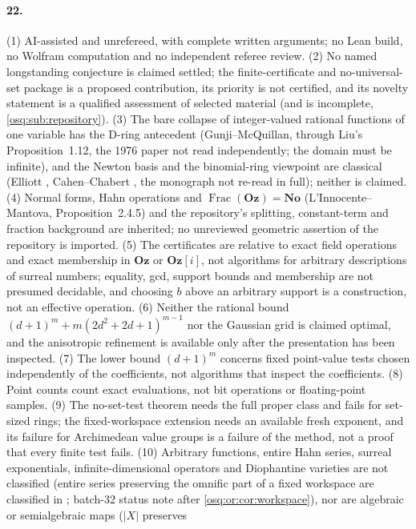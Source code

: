 \documentclass[11pt,letterpaper]{article}
\numberwithin{equation}{section}
\theoremstyle{definition}
\theoremstyle{remark}
\theoremstyle{plain}
\newcommand{\No}{\mathbf{No}}
\newcommand{\Oz}{\mathbf{Oz}}
\newcommand{\GOz}{\Oz[i]}
\newcommand{\Frac}{\operatorname{Frac}}
\begin{document}
\paragraph{22.} (1) AI-assisted and unrefereed, with complete written arguments; no Lean build, no Wolfram computation and no independent referee
review. (2) No named longstanding conjecture is claimed settled; the finite-certificate and no-universal-set package is a proposed contribution, its
priority is not certified, and its novelty statement is a qualified assessment of selected material (and is incomplete, \cref{osq:sub:repository}).
(3) The bare collapse of integer-valued rational functions of one variable has the D-ring antecedent (Gunji--McQuillan, through Liu's
Proposition~1.12, the 1976 paper not read independently; the domain must be infinite), and the Newton basis and the binomial-ring viewpoint are
classical (Elliott \cite{ElliottBirings}, Cahen--Chabert \cite{CC}, the monograph not re-read in full); neither is claimed. (4) Normal forms, Hahn operations and $\Frac(\Oz)=\No$
(L'Innocente--Mantova, Proposition~2.4.5) and the repository's splitting, constant-term and fraction background are inherited; no unreviewed
geometric assertion of the repository is imported. (5) The certificates are relative to exact field operations and exact membership in $\Oz$ or
$\GOz$, not algorithms for arbitrary descriptions of surreal numbers; equality, gcd, support bounds and membership are not presumed decidable, and
choosing $b$ above an arbitrary support is a construction, not an effective operation. (6) Neither the rational bound
$(d+1)^m+m(2d^2+2d+1)^{m-1}$ nor the Gaussian grid is claimed optimal, and the anisotropic refinement is available only after the presentation has
been inspected. (7) The lower bound $(d+1)^m$ concerns fixed point-value tests chosen independently of the coefficients, not algorithms that inspect
the coefficients. (8) Point counts count exact evaluations, not bit operations or floating-point samples. (9) The no-set-test theorem needs the
full proper class and fails for set-sized rings; the fixed-workspace extension needs an available fresh exponent, and its failure for Archimedean
value groups is a failure of the method, not a proof that every finite test fails. (10) Arbitrary functions, entire Hahn series, surreal
exponentials, infinite-dimensional operators and Diophantine varieties are not classified (entire series preserving the omnific part of a
fixed workspace are classified in \cite{RepoEnt}; batch-32 status note after \cref{osq:or:cor:workspace}), nor are algebraic or semialgebraic maps ($|X|$ preserves
\end{document}
